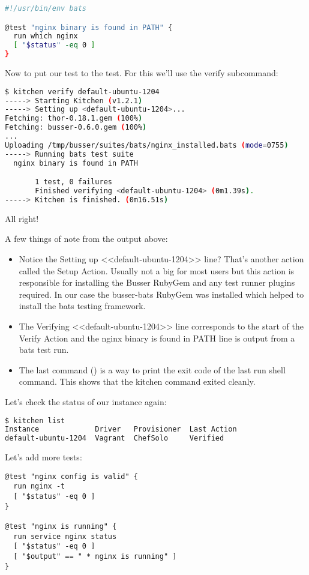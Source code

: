 \begin{lstlisting}[language=Bash,label=lst:testing-test-kitchen14]
#!/usr/bin/env bats

@test "nginx binary is found in PATH" {
  run which nginx
  [ "$status" -eq 0 ]
}
\end{lstlisting}

Now to put our test to the test. For this we'll use the verify subcommand:

\begin{lstlisting}[language=Bash,label=lst:testing-test-kitchen15]
$ kitchen verify default-ubuntu-1204
-----> Starting Kitchen (v1.2.1)
-----> Setting up <default-ubuntu-1204>...
Fetching: thor-0.18.1.gem (100%)
Fetching: busser-0.6.0.gem (100%)
...
Uploading /tmp/busser/suites/bats/nginx_installed.bats (mode=0755)
-----> Running bats test suite
  nginx binary is found in PATH

       1 test, 0 failures
       Finished verifying <default-ubuntu-1204> (0m1.39s).
-----> Kitchen is finished. (0m16.51s)
\end{lstlisting}

All right!

A few things of note from the output above:

\begin{itemize}
  \item Notice the Setting up <<default-ubuntu-1204>> line? That's another action called the Setup Action. Usually not a big for most users but this action is responsible for installing the Busser RubyGem and any test runner plugins required. In our case the busser-bats RubyGem was installed which helped to install the bats testing framework.
  \item The Verifying <<default-ubuntu-1204>> line corresponds to the start of the Verify Action and the nginx binary is found in PATH line is output from a bats test run.
  \item The last command () is a way to print the exit code of the last run shell command. This shows that the kitchen command exited cleanly.
\end{itemize}

Let's check the status of our instance again:

\begin{lstlisting}[language=Bash,label=lst:testing-test-kitchen16]
$ kitchen list
Instance             Driver   Provisioner  Last Action
default-ubuntu-1204  Vagrant  ChefSolo     Verified
\end{lstlisting}

Let's add more tests:

\begin{lstlisting}[label=lst:testing-test-kitchen17]
@test "nginx config is valid" {
  run nginx -t
  [ "$status" -eq 0 ]
}

@test "nginx is running" {
  run service nginx status
  [ "$status" -eq 0 ]
  [ "$output" == " * nginx is running" ]
}
\end{lstlisting}
